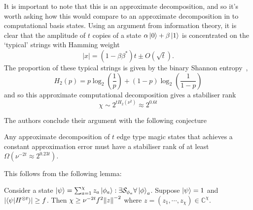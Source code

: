 \documentclass{standalone}
\begin{document}
\par
It is important to note that this is an approximate decomposition, and so it's worth asking how this would compare to an approximate decomposition in to computational basis states. Using an argument from information theory, it is clear that the amplitude of $t$ copies of a state $\alpha\ket{0}+\beta\ket{1}$ is concentrated on the `typical' strings with Hamming weight~\cite{Bravyi2016b,Preskill2016}
\begin{equation}\label{eq:hweight}
    \vert x \vert = (1-\beta\beta^{*})t\pm O(\sqrt{t}).
\end{equation}
The proportion of these typical strings is given by the binary Shannon entropy~\cite{Preskill2016}, 
\[H_{2}(p)= p\log_{2}\left(\frac{1}{p}\right) + (1-p)\log_{2}\left(\frac{1}{1-p}\right)\] 
and so this approximate computational decomposition gives a stabiliser rank~\cite{Bravyi2015}
\begin{equation}\label{eq:approxcomp}
    \chi\sim 2^{tH_{2}(\nu^{2})} \approx 2^{0.6t}
\end{equation}
\par
The authors conclude their argument with the following conjecture
\begin{conj}\label{thm:minscaling}
Any approximate decomposition of $t$ edge type magic states that achieves a constant approximation error must have a stabiliser rank of at least $\Omega\left(\nu^{-2t}\approx2^{0.23t}\right)$.
\end{conj}
This follows from the following lemma:
\begin{lem}\label{thm:scalinglemma}
Consider a state $\ket{\psi}=\sum_{a=1}^{\chi}z_{a}\ket{\phi_{a}}:\exists \mathcal{S}_{\phi_{a}}\forall\ket{\phi}_{a}$. Suppose $\ket{\psi}=1$ and $\left|\braket{\psi}{H^{\otimes t}}\right|\geq f$. Then $\chi\geq\nu^{-2t}f^{2}\norm{z}^{-2}$ where $z=(z_{1},\cdots,z_{\chi})\in\mathbb{C}^{\chi}$.
\end{lem}
\end{document}
